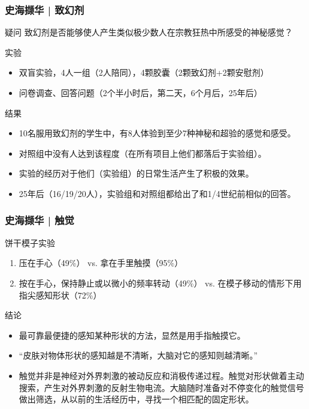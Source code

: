 \begin{frame}
  \frametitle{史海撷华 | 致幻剂}
  \vspace{-0.5em}
  \begin{block}{疑问}
    致幻剂是否能够使人产生类似极少数人在宗教狂热中所感受的神秘感觉？
  \end{block}
  \vspace{-0.5em}
  \pause
  \begin{block}{实验}
    \begin{itemize}
      \item 双盲实验，4人一组（2人陪同），4颗胶囊（2颗致幻剂+2颗安慰剂）
      \item 问卷调查、回答问题（2个半小时后，第二天，6个月后，25年后）
    \end{itemize}
  \end{block}
  \vspace{-0.5em}
  \pause
  \begin{block}{结果}
    \begin{itemize}
      \item 10名服用致幻剂的学生中，有8人体验到至少7种神秘和超验的感觉和感受。
      \item 对照组中没有人达到该程度（在所有项目上他们都落后于实验组）。
      \item \alert{实验的经历对于他们（实验组）的日常生活产生了积极的效果。}
      \item 25年后（16/19/20人），实验组和对照组都给出了和1/4世纪前相似的回答。
    \end{itemize}
  \end{block}
\end{frame}

\begin{frame}
  \frametitle{史海撷华 | 触觉}
  \begin{block}{饼干模子实验}
    \begin{enumerate}
      \item 压在手心（49\%） vs. 拿在手里触摸（95\%）
      \item 按在手心，保持静止或以微小的频率转动（49\%） vs. 在模子移动的情形下用指尖感知形状（72\%）
    \end{enumerate}
  \end{block}
  \pause
  \begin{block}{结论}
    \begin{itemize}
      \item 最可靠最便捷的感知某种形状的方法，显然是用手指触摸它。
      \item “\alert{皮肤对物体形状的感知越是不清晰，大脑对它的感知则越清晰。}”
      \item 触觉并非是神经对外界刺激的被动反应和消极传递过程。触觉对形状做着主动搜索，产生对外界刺激的反射生物电流。大脑随时准备对不停变化的触觉信号做出筛选，从以前的生活经历中，寻找一个相匹配的固定形状。
    \end{itemize}
  \end{block}
\end{frame}

